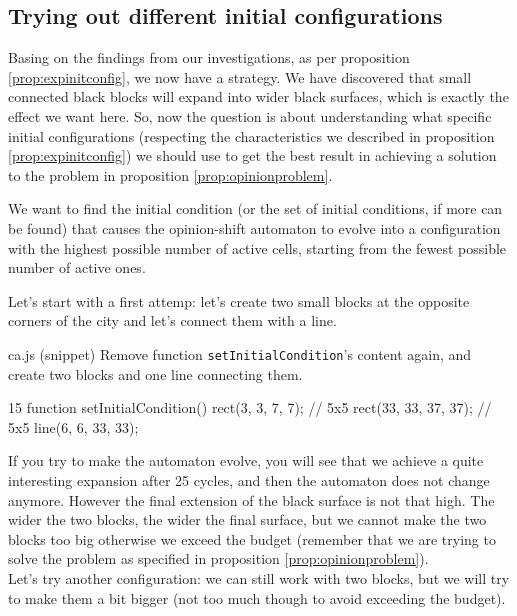 \subsection{Trying out different initial configurations}
Basing on the findings from our investigations, as per proposition \ref{prop:expinitconfig}, we
now have a strategy. We have discovered that small connected black blocks will expand into wider
black surfaces, which is exactly the effect we want here. So, now the question is about understanding
what specific initial configurations (respecting the characteristics we described in
proposition \ref{prop:expinitconfig}) we should use to get the best result in achieving a solution
to the problem in proposition \ref{prop:opinionproblem}.

\begin{proposition}
\label{prop:simobj}
We want to find the initial condition (or the set of initial conditions, if more can be found)
that causes the opinion-shift automaton to evolve into a configuration with the
highest possible number of active cells, starting from the fewest possible number of active ones.
\end{proposition}

Let's start with a first attemp: let's create two small blocks at the opposite corners of the city
and let's connect them with a line.

\begin{programcode}{ca.js (snippet)}
Remove function \texttt{setInitialCondition}'s content again, and create two blocks and one
line connecting them.
\begin{codeh1}{1}{5}
function setInitialCondition() {
  rect(3, 3, 7, 7); // 5x5
  rect(33, 33, 37, 37); // 5x5
  line(6, 6, 33, 33);
}
\end{codeh1}
\end{programcode}

If you try to make the automaton evolve, you will see that we achieve a quite interesting
expansion after 25 cycles, and then the automaton does not change anymore. However the
final extension of the black surface is not that high. The wider the two blocks, the wider the
final surface, but we cannot make the two blocks too big otherwise we exceed the
budget (remember that we are trying to solve the problem as specified in proposition
\ref{prop:opinionproblem}).\\

Let's try another configuration: we can still work with two blocks, but we will try to make them a
bit bigger (not too much though to avoid exceeding the budget).

